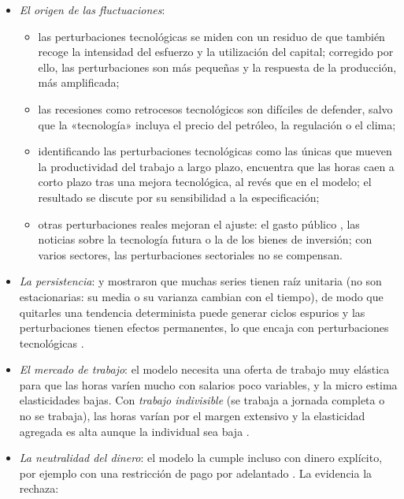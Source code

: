 \documentclass[11pt]{article}
\begin{document}
\begin{itemize}
\item \emph{El origen de las fluctuaciones}:
  \begin{itemize}
  \item las perturbaciones tecnológicas se miden con un residuo de  que también recoge la intensidad del esfuerzo y la utilización del capital; corregido por ello, las perturbaciones son más pequeñas y la respuesta de la producción, más amplificada\nocite{BurnsideEichenbaumRebelo1993Labor,BasuFernaldKimball2006Are};
  \item las recesiones como retrocesos tecnológicos son difíciles de defender, salvo que la «tecnología» incluya el precio del petróleo, la regulación o el clima;
  \item identificando las perturbaciones tecnológicas como las únicas que mueven la productividad del trabajo a largo plazo, \textcite{Gali1999Technology} encuentra que las horas caen a corto plazo tras una mejora tecnológica, al revés que en el modelo; el resultado se discute por su sensibilidad a la especificación;
  \item otras perturbaciones reales mejoran el ajuste: el gasto público\nocite{ChristianoEichenbaum1992Current,BaxterKing1993Fiscal} , las noticias sobre la tecnología futura o la de los bienes de inversión; con varios sectores, las perturbaciones sectoriales no se compensan\nocite{LongPlosser1983Real}.
  \end{itemize}
\item \emph{La persistencia}: \textcite{NelsonKang1981Spurious} y \textcite{NelsonPlosser1982Trends} mostraron que muchas series tienen raíz unitaria (no son estacionarias: su media o su varianza cambian con el tiempo), de modo que quitarles una tendencia determinista puede generar ciclos espurios y las perturbaciones tienen efectos permanentes, lo que encaja con perturbaciones tecnológicas .
\item \emph{El mercado de trabajo}: el modelo necesita una oferta de trabajo muy elástica para que las horas varíen mucho con salarios poco variables, y la micro estima elasticidades bajas. Con \emph{trabajo indivisible} (se trabaja a jornada completa o no se trabaja), las horas varían por el margen extensivo y la elasticidad agregada es alta aunque la individual sea baja\nocite{Hansen1985Indivisible,Rogerson1988Indivisible} .
\item \emph{La neutralidad del dinero}: el modelo la cumple incluso con dinero explícito, por ejemplo con una restricción de pago por adelantado\nocite{CooleyHansen1989Inflation} . La evidencia la rechaza:

\end{itemize}
\end{document}
